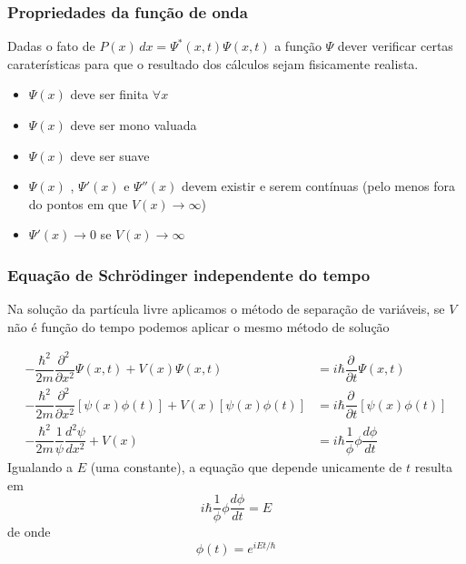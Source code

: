 \documentclass[12pt,brazil]{beamer}
\begin{document}

\begin{frame}
  \frametitle{Propriedades da função de onda}
  \fontsize{11pt}{11pt}\selectfont
  
  Dadas o fato de $P(x)\, dx = \Psi ^* (x,t) \Psi (x,t)$ a função $\Psi$ dever verificar certas caraterísticas para que o resultado dos cálculos sejam fisicamente realista.
  
  \begin{itemize}
   \item $\Psi (x)$ deve ser finita $\forall x$
   \item $\Psi (x)$ deve ser mono valuada
   \item $\Psi (x)$ deve ser suave
   \item $\Psi (x)$ , $\Psi' (x)$ e $\Psi'' (x)$ devem existir e serem contínuas (pelo menos fora do pontos em que $V(x) \to \infty$)
   \item $\Psi' (x) \to 0$  se $V(x) \to \infty$
  \end{itemize}

\end{frame}




\begin{frame}
  \frametitle{Equação de Schrödinger independente do tempo}
  \fontsize{10pt}{11pt}\selectfont
  
  Na solução da partícula livre aplicamos o método de separação de variáveis, se $V$ não é função do tempo podemos aplicar o mesmo método de solução
  
      \[
        \begin{align*}
          -\dfrac{\hbar^2}{2m}\dfrac{\partial^2\,}{\partial x^2}\Psi(x,t) + V(x) \Psi(x,t) &= i\hbar \dfrac{\partial\,}{\partial t}\Psi(x,t)\\
          -\dfrac{\hbar^2}{2m}\dfrac{\partial^2\,}{\partial x^2}\left[ \psi(x) \phi(t) \right] + V(x) \left[ \psi(x) \phi(t) \right] &= i\hbar \dfrac{\partial\,}{\partial t}\left[ \psi(x) \phi(t) \right]\\
          -\dfrac{\hbar^2}{2m}\dfrac{1}{\psi}\dfrac{d^2\psi}{dx^2} +V(x)&= i\hbar \dfrac{1}{\phi}\phi\dfrac{d\phi}{dt}
        \end{align*}
      \]
      Igualando a $E$ (uma constante), a equação que depende unicamente de $t$ resulta em
      \[
       i\hbar \dfrac{1}{\phi}\phi\dfrac{d\phi}{dt} = E
      \]
      de onde
      \[
       \phi(t) = e^{iEt/\hbar}
      \]
  
\end{frame}
\end{document}
